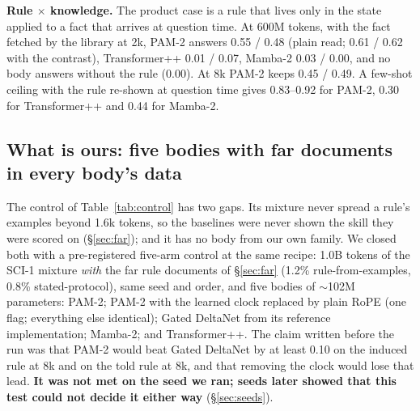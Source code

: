 \documentclass[11pt]{article}
\newcommand{\arch}{PAM-2}
\newcommand{\tpp}{Transformer++}
\newcommand{\mamba}{Mamba-2}
\newcommand{\scione}{SCI-1}
\begin{document}
\textbf{Rule $\times$ knowledge.} The product case is a rule that lives only in the state applied to a fact that arrives at question time. At 600M tokens, with the fact fetched by the library at 2k, \arch{} answers 0.55 / 0.48 (plain read; 0.61 / 0.62 with the contrast), \tpp{} 0.01 / 0.07, \mamba{} 0.03 / 0.00, and no body answers without the rule (0.00). At 8k \arch{} keeps 0.45 / 0.49. A few-shot ceiling with the rule re-shown at question time gives 0.83--0.92 for \arch{}, 0.30 for \tpp{} and 0.44 for \mamba.

\subsection{What is ours: five bodies with far documents in every body's data}
\label{sec:wio}
The control of Table~\ref{tab:control} has two gaps. Its mixture never spread a rule's examples beyond 1.6k tokens, so the baselines were never shown the skill they were scored on (\S\ref{sec:far}); and it has no body from our own family. We closed both with a pre-registered five-arm control at the same recipe: 1.0B tokens of the \scione{} mixture \emph{with} the far rule documents of \S\ref{sec:far} (1.2\% rule-from-examples, 0.8\% stated-protocol), same seed and order, and five bodies of $\sim$102M parameters: \arch; \arch{} with the learned clock replaced by plain RoPE (one flag; everything else identical); Gated DeltaNet \citep{yang2024gated} from its reference implementation; \mamba; and \tpp. The claim written before the run was that \arch{} would beat Gated DeltaNet by at least 0.10 on the induced rule at 8k and on the told rule at 8k, and that removing the clock would lose that lead. \textbf{It was not met on the seed we ran; seeds later showed that this test could not decide it either way} (\S\ref{sec:seeds}).
\end{document}
